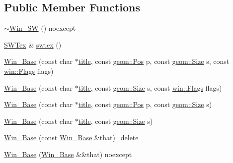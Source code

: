 \subsection*{Public Member Functions}
\begin{DoxyCompactItemize}
\item 
\mbox{\hyperlink{classrolmodl_1_1_win___s_w_a73d5d5759c4a9e34513d3b719ad6fd43}{$\sim$\+Win\+\_\+\+SW}} () noexcept
\item 
\mbox{\hyperlink{classrolmodl_1_1_s_w_tex}{S\+W\+Tex}} \& \mbox{\hyperlink{classrolmodl_1_1_win___s_w_a0e9cc5aac3ad68a01b450b424cd185cd}{swtex}} ()
\item 
\mbox{\hyperlink{classrolmodl_1_1_win___s_w_a3ff14fcd3028c11faaaa4dc2b70de9ac}{Win\+\_\+\+Base}} (const char $\ast$\mbox{\hyperlink{classrolmodl_1_1_win___base_abc249a06cd285e302175c0371ed2564a}{title}}, const \mbox{\hyperlink{structrolmodl_1_1geom_1_1_pos}{geom\+::\+Pos}} p, const \mbox{\hyperlink{structrolmodl_1_1geom_1_1_size}{geom\+::\+Size}} s, const \mbox{\hyperlink{structrolmodl_1_1win_1_1_flags}{win\+::\+Flags}} flags)
\item 
\mbox{\hyperlink{classrolmodl_1_1_win___s_w_aaa9e04d7aa993555afbdf34ab3fd92f0}{Win\+\_\+\+Base}} (const char $\ast$\mbox{\hyperlink{classrolmodl_1_1_win___base_abc249a06cd285e302175c0371ed2564a}{title}}, const \mbox{\hyperlink{structrolmodl_1_1geom_1_1_size}{geom\+::\+Size}} s, const \mbox{\hyperlink{structrolmodl_1_1win_1_1_flags}{win\+::\+Flags}} flags)
\item 
\mbox{\hyperlink{classrolmodl_1_1_win___s_w_a520190cbd5064e620f0fca89eaae6f06}{Win\+\_\+\+Base}} (const char $\ast$\mbox{\hyperlink{classrolmodl_1_1_win___base_abc249a06cd285e302175c0371ed2564a}{title}}, const \mbox{\hyperlink{structrolmodl_1_1geom_1_1_pos}{geom\+::\+Pos}} p, const \mbox{\hyperlink{structrolmodl_1_1geom_1_1_size}{geom\+::\+Size}} s)
\item 
\mbox{\hyperlink{classrolmodl_1_1_win___s_w_afb98cea3cee1b466a4bb51d275123238}{Win\+\_\+\+Base}} (const char $\ast$\mbox{\hyperlink{classrolmodl_1_1_win___base_abc249a06cd285e302175c0371ed2564a}{title}}, const \mbox{\hyperlink{structrolmodl_1_1geom_1_1_size}{geom\+::\+Size}} s)
\item 
\mbox{\hyperlink{classrolmodl_1_1_win___s_w_afa33e371e1333e1fee8c2aac7fadf3d7}{Win\+\_\+\+Base}} (const \mbox{\hyperlink{classrolmodl_1_1_win___base}{Win\+\_\+\+Base}} \&that)=delete
\item 
\mbox{\hyperlink{classrolmodl_1_1_win___s_w_a87cda590b1948eaf6d1638fe044cdd63}{Win\+\_\+\+Base}} (\mbox{\hyperlink{classrolmodl_1_1_win___base}{Win\+\_\+\+Base}} \&\&that) noexcept
\end{DoxyCompactItemize}


